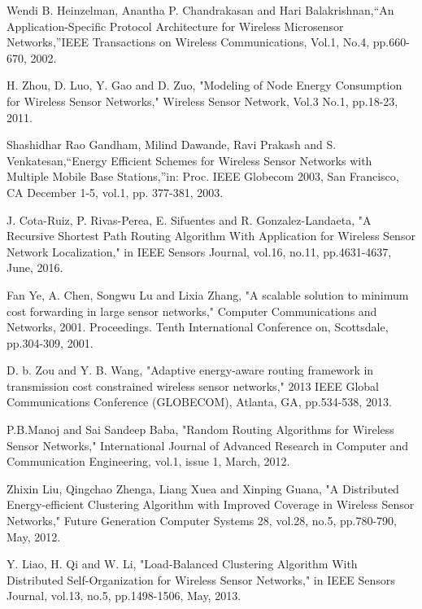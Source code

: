 \documentclass[a4j,10pt]{jarticle}
\begin{document}


\vspace{1cm}
\small
\begin{thebibliography}{9}

Wendi B. Heinzelman, Anantha P. Chandrakasan and Hari Balakrishnan,“An Application-Specific Protocol Architecture for Wireless Microsensor Networks,”IEEE Transactions on Wireless Communications, Vol.1, No.4, pp.660-670, 2002.

H. Zhou, D. Luo, Y. Gao and D. Zuo, "Modeling of Node Energy Consumption for Wireless Sensor Networks," Wireless Sensor Network, Vol.3 No.1, pp.18-23, 2011.

Shashidhar Rao Gandham, Milind Dawande, Ravi Prakash and S. Venkatesan,“Energy Efficient Schemes for Wireless Sensor Networks with Multiple Mobile Base Stations,”in: Proc. IEEE Globecom 2003, San Francisco, CA December 1-5, vol.1, pp. 377-381, 2003.

J. Cota-Ruiz, P. Rivas-Perea, E. Sifuentes and R. Gonzalez-Landaeta, "A Recursive Shortest Path Routing Algorithm With Application for Wireless Sensor Network Localization," in IEEE Sensors Journal, vol.16, no.11, pp.4631-4637, June, 2016.

Fan Ye, A. Chen, Songwu Lu and Lixia Zhang, "A scalable solution to minimum cost forwarding in large sensor networks," Computer Communications and Networks, 2001. Proceedings. Tenth International Conference on, Scottsdale, pp.304-309, 2001.

D. b. Zou and Y. B. Wang, "Adaptive energy-aware routing framework in transmission cost constrained wireless sensor networks," 2013 IEEE Global Communications Conference (GLOBECOM), Atlanta, GA, pp.534-538, 2013.

P.B.Manoj and Sai Sandeep Baba, "Random Routing Algorithms for Wireless Sensor Networks," International Journal of Advanced Research in Computer and Communication Engineering, vol.1, issue 1, March, 2012.

Zhixin Liu, Qingchao Zhenga, Liang Xuea and Xinping Guana, "A Distributed Energy-efficient Clustering Algorithm with Improved Coverage in Wireless Sensor Networks," Future Generation Computer Systems 28, vol.28, no.5, pp.780-790, May, 2012.

Y. Liao, H. Qi and W. Li, "Load-Balanced Clustering Algorithm With Distributed Self-Organization for Wireless Sensor Networks," in IEEE Sensors Journal, vol.13, no.5, pp.1498-1506, May, 2013.

\end{thebibliography}

\small
\end{document}
